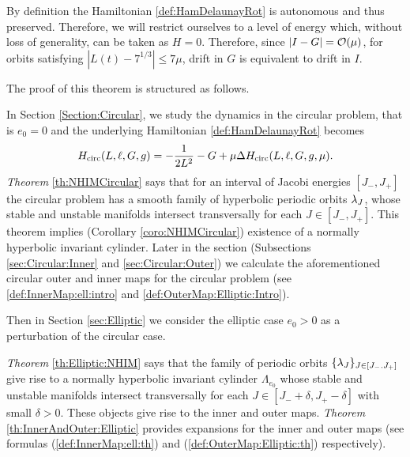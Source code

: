 
By definition the Hamiltonian \eqref{def:HamDelaunayRot} is autonomous 
and thus preserved. Therefore, we will
restrict ourselves to a level of energy which, without loss of generality, can
be taken as $H=0$. Therefore,  since $|I-G|=\mathcal{O}(\mu)$, for orbits satisfying
$\left| L(t)-7^{1/3}\right|\leq 7\mu$, drift in $G$ is equivalent to
drift in $I$.


The proof of this theorem is structured as follows.

In Section \ref{Section:Circular}, we study the dynamics in the circular problem,
that is
$e_0=0$ and the underlying Hamiltonian \eqref{def:HamDelaunayRot} becomes
\begin{equation}\label{def:HamDelaunayCirc}
  H_{\mathrm{circ}}(L,\ell,G, g)=-\frac{1}{2L^2}-G+\mu \Delta H_{\mathrm{circ}}(L,\ell,G, g,\mu).
\end{equation}
{\it Theorem} \ref{th:NHIMCircular} says that for an interval of Jacobi energies
$[J_-,J_+]$ the circular problem has a smooth family of hyperbolic periodic
orbits $\lambda_J$,  whose stable and unstable manifolds intersect
transversally for each $J \in [J_-,J_+]$. This theorem implies
(Corollary \ref{coro:NHIMCircular}) existence of a normally hyperbolic
invariant cylinder. Later in the section (Subsections \ref{sec:Circular:Inner}
and \ref{sec:Circular:Outer}) we calculate  the aforementioned circular outer
and inner maps for the circular problem (see \eqref{def:InnerMap:ell:intro} 
and \eqref{def:OuterMap:Elliptic:Intro}).


Then in Section \ref{sec:Elliptic}  we consider the elliptic case $e_0>0$
as a perturbation of the circular case.

{\it Theorem} \ref{th:Elliptic:NHIM} says that the family of periodic orbits
$\{\lambda_J\}_{J\in [J_-.J_+]}$ give rise to a normally hyperbolic invariant
cylinder $\Lambda_{e_0}$ whose stable and unstable manifolds intersect
transversally for each $J \in [J_-+\delta,J_+ - \delta]$ with small $\delta>0$.
These objects give rise to the inner and outer maps.
{\it Theorem} \ref{th:InnerAndOuter:Elliptic} provides expansions for
the inner and outer maps (see formulas (\ref{def:InnerMap:ell:th}) and
(\ref{def:OuterMap:Elliptic:th}) respectively).

